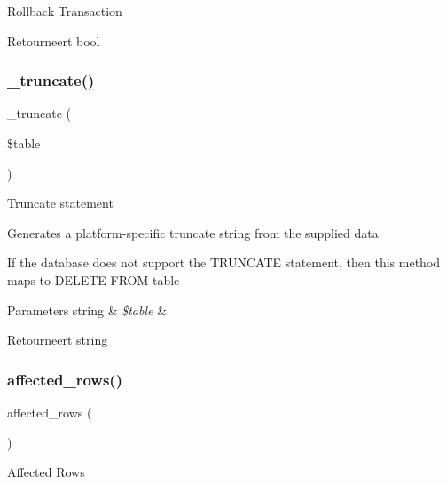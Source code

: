 Rollback Transaction

\begin{DoxyReturn}{Retourneert}
bool 
\end{DoxyReturn}
\mbox{\label{class_c_i___d_b__pdo__driver_aa029600528fc1ce660a23ff4b4667f95}} 
\subsubsection{\texorpdfstring{\_truncate()}{\_truncate()}}
{\footnotesize\ttfamily \+\_\+truncate (\begin{DoxyParamCaption}\item[{}]{\$table }\end{DoxyParamCaption})\hspace{0.3cm}{\ttfamily [protected]}}

Truncate statement

Generates a platform-\/specific truncate string from the supplied data

If the database does not support the T\+R\+U\+N\+C\+A\+TE statement, then this method maps to \textquotesingle{}D\+E\+L\+E\+TE F\+R\+OM table\textquotesingle{}


\begin{DoxyParams}[1]{Parameters}
string & {\em \$table} & \\
\hline
\end{DoxyParams}
\begin{DoxyReturn}{Retourneert}
string 
\end{DoxyReturn}
\mbox{\label{class_c_i___d_b__pdo__driver_a77248aaad33eb132c04cc4aa3f4bc8cb}} 
\subsubsection{\texorpdfstring{affected\_rows()}{affected\_rows()}}
{\footnotesize\ttfamily affected\+\_\+rows (\begin{DoxyParamCaption}{ }\end{DoxyParamCaption})}

Affected Rows

